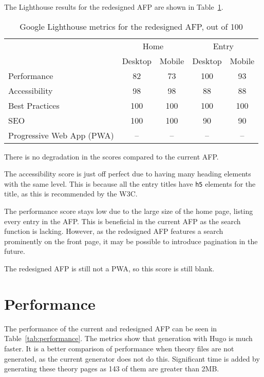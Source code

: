 \documentclass[bsc,frontabs,oneside,singlespacing,parskip,deptreport,logo]{infthesis}
\begin{document}
The Lighthouse results for the redesigned AFP are shown in Table~\ref{tab:lighthouse-redesign}. 

\begin{table}[h]
\centering
{}
\begin{tabularx}{0.5\textwidth}{lcccc}
                          & \multicolumn{2}{c}{Home} & \multicolumn{2}{c}{Entry} \\
                          & Desktop     & Mobile     & Desktop      & Mobile     \\
Performance               & 82          & 73         & 100          & 93         \\
Accessibility             & 98          & 98         & 88           & 88         \\
Best Practices            & 100         & 100        & 100          & 100        \\
SEO                       & 100         & 100        & 90           & 90         \\
Progressive Web App (PWA) & --          & --         & --           & --        
\end{tabularx}
\caption{Google Lighthouse metrics for the redesigned AFP, out of 100}
\label{tab:lighthouse-redesign}
\end{table}

There is no degradation in the scores compared to the current AFP\@. 

The accessibility score is just off perfect due to having many heading elements with the same level. This is because all the entry titles have \verb|h5| elements for the title, as this is recommended by the W3C.

The performance score stays low due to the large size of the home page, listing every entry in the AFP\@. This is beneficial in the current AFP as the search function is lacking. However, as the redesigned AFP features a search prominently on the front page, it may be possible to introduce pagination in the future.

The redesigned AFP is still not a PWA, so this score is still blank.

\section{Performance} \label{sec:performance}

The performance of the current and redesigned AFP can be seen in Table~\ref{tab:performance}. The metrics show that generation with Hugo is much faster. It is a better comparison of performance when theory files are not generated, as the current generator does not do this. Significant time is added by generating these theory pages as 143 of them are greater than 2MB. 
\end{document}
